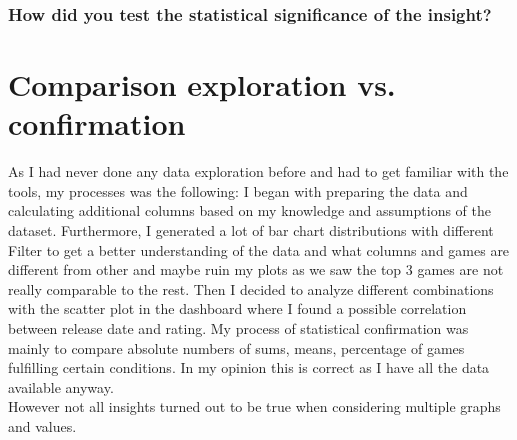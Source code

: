 \documentclass[11pt]{article}
\begin{document}
\subsubsection{How did you test the statistical significance of the insight?}

\section{Comparison exploration vs. confirmation}

As I had never done any data exploration before and had to get familiar with the tools, my processes was the following: I began with preparing the data and calculating additional columns based on my knowledge and assumptions of the dataset. Furthermore, I generated a lot of bar chart distributions with different Filter to get a better understanding of the data and what columns and games are different from other and maybe ruin my plots as we saw the top 3 games are not really comparable to the rest.
Then I decided to analyze different combinations with the scatter plot in the dashboard where I found a possible correlation between release date and rating. My process of statistical confirmation was mainly to compare absolute numbers of sums, means, percentage of games fulfilling certain conditions. In my opinion this is correct as I have all the data available anyway.\\
However not all insights turned out to be true when considering multiple graphs and values. 
\end{document}
